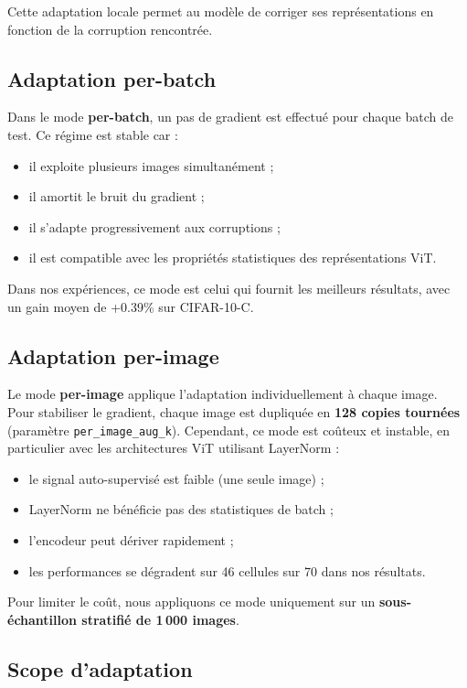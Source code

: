 \documentclass[12pt,a4paper]{report}
\begin{document}
	Cette adaptation locale permet au modèle de corriger ses représentations en fonction de la corruption rencontrée.
	
	\subsection{Adaptation per-batch}
	
	Dans le mode \textbf{per-batch}, un pas de gradient est effectué pour chaque batch de test.  
	Ce régime est stable car :
	\begin{itemize}
		\item il exploite plusieurs images simultanément ;
		\item il amortit le bruit du gradient ;
		\item il s’adapte progressivement aux corruptions ;
		\item il est compatible avec les propriétés statistiques des représentations ViT.
	\end{itemize}
	
	Dans nos expériences, ce mode est celui qui fournit les meilleurs résultats, avec un gain moyen de +0.39\% sur CIFAR-10-C.
	
	\subsection{Adaptation per-image}
	
	Le mode \textbf{per-image} applique l’adaptation individuellement à chaque image.  
	Pour stabiliser le gradient, chaque image est dupliquée en \textbf{128 copies tournées} (paramètre \texttt{per\_image\_aug\_k}).  
	Cependant, ce mode est coûteux et instable, en particulier avec les architectures ViT utilisant LayerNorm :
	\begin{itemize}
		\item le signal auto-supervisé est faible (une seule image) ;
		\item LayerNorm ne bénéficie pas des statistiques de batch ;
		\item l’encodeur peut dériver rapidement ;
		\item les performances se dégradent sur 46 cellules sur 70 dans nos résultats.
	\end{itemize}
	
	Pour limiter le coût, nous appliquons ce mode uniquement sur un \textbf{sous-échantillon stratifié de 1\,000 images}.
	
	\subsection{Scope d’adaptation}
	
\end{document}
